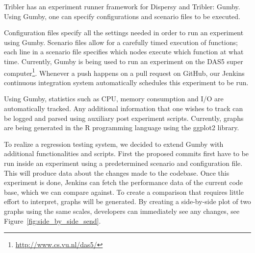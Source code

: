 Tribler has an experiment runner framework for Dispersy and Tribler: Gumby.
Using Gumby, one can specify configurations and scenario files to be executed.

Configuration files specify all the settings needed in order to run an experiment using Gumby.
Scenario files allow for a carefully timed execution of functions; each line in a scenario file specifies which nodes execute which function at what time. 
Currently, Gumby is being used to run an experiment on the DAS5 super computer\footnote{\url{http://www.cs.vu.nl/das5/}}.
Whenever a push happens on a pull request on GitHub, our Jenkins continuous integration system automatically schedules this experiment to be run.

Using Gumby, statistics such as CPU, memory consumption and I/O are automatically tracked.
Any additional information that one wishes to track can be logged and parsed using auxiliary post experiment scripts.
Currently, graphs are being generated in the R programming language using the ggplot2 library.

To realize a regression testing system, we decided to extend Gumby with additional functionalities and scripts.
First the proposed commits first have to be run inside an experiment using a predetermined scenario and configuration file.
This will produce data about the changes made to the codebase.
Once this experiment is done, Jenkins can fetch the performance data of the current code base, which we can compare against.
To create a comparison that requires little effort to interpret, graphs  will be generated.
By creating a side-by-side plot of two graphs using the same scales, developers can immediately see any changes, see Figure~\ref{fig:side_by_side_send}.